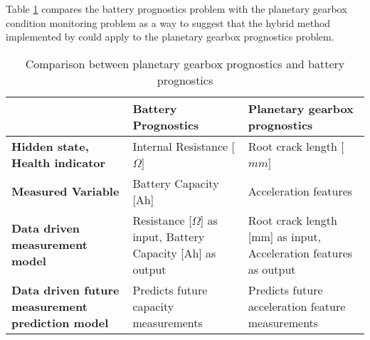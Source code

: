 


Table \ref{t:Compare} compares the battery prognostics problem with the planetary gearbox condition monitoring problem as a way to suggest that the hybrid method implemented by \cite{Liao2016} could apply to the planetary gearbox prognostics problem.




\begin{table}[H]
	\centering
	\caption{Comparison between planetary gearbox prognostics and battery prognostics}
	\label{t:Compare}
	\begin{tabular}{|p{4cm}|p{6cm}|p{6cm}|}
		\hline
		&\textbf{Battery Prognostics}  & \textbf{Planetary gearbox prognostics} \\ \hline
		\textbf{Hidden state, Health indicator} & Internal Resistance [$\Omega$] & Root crack length [$mm$] \\\hline
		\textbf{Measured Variable} & Battery Capacity [Ah] & Acceleration features \\\hline
		\textbf{Data driven measurement model} & Resistance [$\Omega$] as input, Battery Capacity [Ah] as output & Root crack length [mm] as input, Acceleration features as output \\\hline
		\textbf{Data driven future measurement prediction model} & Predicts future capacity measurements & Predicts future acceleration feature measurements \\ \hline
	\end{tabular}
\end{table}







